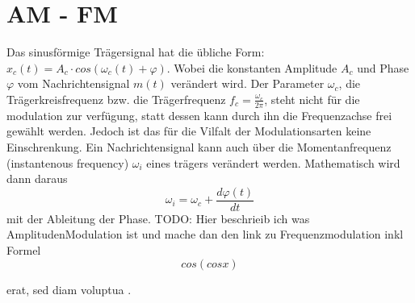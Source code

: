 %
%
%
\section{AM - FM\label{fm:section:teil0}}

Das sinusförmige Trägersignal hat die übliche Form: 
\(x_c(t) = A_c \cdot cos(\omega_c(t)+\varphi)\).
Wobei die konstanten Amplitude \(A_c\) und Phase \(\varphi\) vom Nachrichtensignal \(m(t)\) verändert wird.
Der Parameter \(\omega_c\), die Trägerkreisfrequenz bzw. die Trägerfrequenz \(f_c = \frac{\omega_c}{2\pi}\),
steht nicht für die modulation zur verfügung, statt dessen kann durch ihn die Frequenzachse frei gewählt werden.
\newblockpunct
Jedoch ist das für die Vilfalt der Modulationsarten keine Einschrenkung.
Ein Nachrichtensignal kann auch über die Momentanfrequenz (instantenous frequency) \(\omega_i\) eines trägers verändert werden.
Mathematisch wird dann daraus
\[
    \omega_i = \omega_c + \frac{d \varphi(t)}{dt}
\]
mit der Ableitung der Phase.
\newline
\newline
TODO:
Hier beschrieib ich was AmplitudenModulation ist und mache dan den link zu Frequenzmodulation inkl Formel \[cos( cos x)\]



erat, sed diam voluptua \cite{fm:bibtex}.


